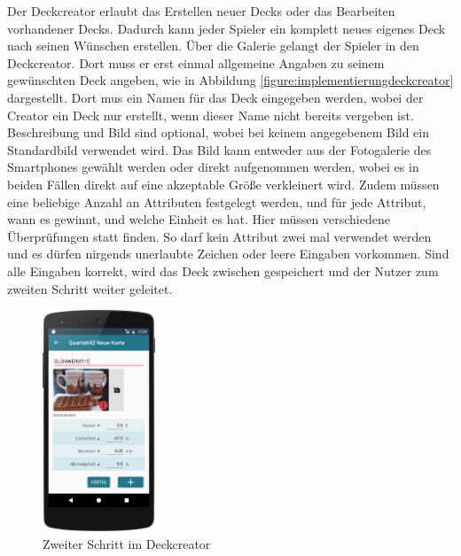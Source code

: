 Der Deckcreator erlaubt das Erstellen neuer Decks oder das Bearbeiten vorhandener Decks. Dadurch kann jeder Spieler ein komplett neues eigenes Deck nach seinen Wünschen erstellen. Über die Galerie gelangt der Spieler in den Deckcreator. Dort muss er erst einmal allgemeine Angaben zu seinem gewünschten Deck angeben, wie in Abbildung \ref{figure:implementierungdeckcreator} dargestellt. Dort mus ein Namen für das Deck eingegeben werden, wobei der Creator ein Deck nur erstellt, wenn dieser Name nicht bereits vergeben ist. Beschreibung und Bild sind optional, wobei bei keinem angegebenem Bild ein Standardbild verwendet wird. Das Bild kann entweder aus der Fotogalerie des Smartphones gewählt werden oder direkt aufgenommen werden, wobei es in beiden Fällen direkt auf eine akzeptable Größe verkleinert wird. Zudem müssen eine beliebige Anzahl an Attributen festgelegt werden, und für jede Attribut, wann es gewinnt, und welche Einheit es hat. Hier müssen verschiedene Überprüfungen statt finden. So darf kein Attribut zwei mal verwendet werden und es dürfen nirgends unerlaubte Zeichen oder leere Eingaben vorkommen. Sind alle Eingaben korrekt, wird das Deck zwischen gespeichert und der Nutzer zum zweiten Schritt weiter geleitet.

\begin{figure}[htp]
	\centering
  	\includegraphics[width=0.3\textwidth]{img/screenshots/device_new_card.png}
	\caption{Zweiter Schritt im Deckcreator}
	\label{figure:implementierungdeckeditor}
\end{figure}

